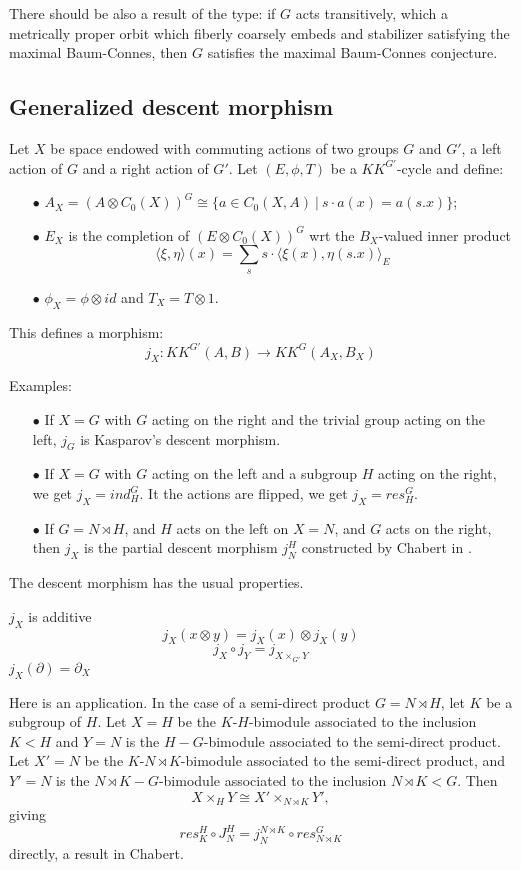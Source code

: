 There should be also a result of the type: if $G$ acts transitively, which a metrically proper orbit which fiberly coarsely embeds and stabilizer satisfying the maximal Baum-Connes, then $G$ satisfies the maximal Baum-Connes conjecture.

\subsection{Generalized descent morphism}

Let $X$ be space endowed with commuting actions of two groups $G$ and $G'$, a left action of $G$ and a right action of $G'$. Let $(E,\phi, T)$ be a $KK^{G'}$-cycle and define:
\begin{itemize}
\item[$\bullet$] $A_X = (A\otimes C_0(X))^G \cong \{a \in C_0(X,A) \ | \ s\cdot a(x) = a(s.x)\}$;
\item[$\bullet$] $E_X$ is the completion of $(E\otimes C_0(X))^G$ wrt the $B_X$-valued inner product
\[ \langle \xi , \eta  \rangle (x) =\sum_s s\cdot \langle \xi(x) , \eta (s.x) \rangle_E\]
\item[$\bullet$] $\phi_X = \phi \otimes id $ and $T_X = T\otimes 1$.  
\end{itemize}

This defines a morphism:
\[ j_X: KK^{G'}(A,B) \rightarrow  KK^{G}(A_X,B_X) \]

Examples:
\begin{itemize}
\item[$\bullet$] If $X=G$ with $G$ acting on the right and the trivial group acting on the left, $j_G$ is Kasparov's descent morphism.
\item[$\bullet$] If $X=G$ with $G$ acting on the left and a subgroup $H$ acting on the right, we get $j_X=  ind_H^G$. It the actions are flipped, we get $j_X= res_H^G$.
\item[$\bullet$] If $G = N\rtimes H$, and $H$ acts on the left on $X=N$, and $G$ acts on the right, then $j_X$ is the partial descent morphism $j_N^H$ constructed by Chabert in \cite{}. 
\end{itemize}

The descent morphism has the usual properties.
\begin{prop}
$j_X$ is additive
\[j_X(x\otimes y ) = j_X(x)\otimes j_X(y)\]
\[j_X \circ j_Y = j_{X\times_{G'} Y} \]
$j_X(\partial ) =\partial_X$
\end{prop}

Here is an application. In the case of a semi-direct product $G = N\rtimes H$, let $K$ be a subgroup of $H$. Let $X=H$ be the $K$-$H$-bimodule associated to the inclusion $K<H$ and $Y = N$ is the $H-G$-bimodule associated to the semi-direct product. Let $X'=N$ be the $K$-$N\rtimes K$-bimodule associated to the semi-direct product, and $Y' = N$ is the $N\rtimes K-G$-bimodule associated to the inclusion $N\rtimes K < G$. Then 
\[ X\times_{H} Y \cong X'\times_{N\rtimes K} Y',\]
giving 
\[res_{K}^H \circ J_N^H = j_N^{N\rtimes K} \circ res_{N\rtimes K}^G\]
directly, a result in Chabert.\\

